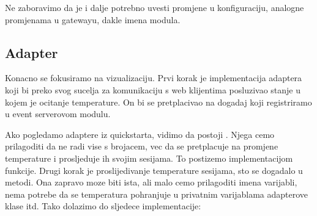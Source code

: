 \documentclass[letterpaper,10pt,croatian]{sphinxmanual}
\begin{document}
\begin{sphinxVerbatim}[commandchars=\\\{\}]
       
         \PYG{p}{[}
                     
                          
               \PYG{p}{]}
\end{sphinxVerbatim}

\sphinxAtStartPar
Ne zaboravimo da je i dalje potrebno uvesti promjene u konfiguraciju, analogne
promjenama u gatewayu, dakle imena modula.


\subsection{Adapter}
\label{\detokenize{03-hat-modbus-workshop/index:adapter}}
\noindent{}

\sphinxAtStartPar
Konacno se fokusiramo na vizualizaciju. Prvi korak je implementacija adaptera
koji bi preko svog sucelja za komunikaciju s web klijentima posluzivao stanje
u kojem je ocitanje temperature. On bi se pretplacivao na 
dogadaj koji registriramo u event serverovom modulu.

\sphinxAtStartPar
Ako pogledamo adaptere iz quickstarta, vidimo da postoji
. Njega cemo prilagoditi da ne radi vise
s brojacem, vec da se pretplacuje na promjene temperature i prosljeduje ih
svojim sesijama. To postizemo implementacijom  funkcije.
Drugi korak je proslijedivanje temperature sesijama, sto se dogadalo u
 metodi. Ona zapravo moze biti ista, ali malo cemo prilagoditi
imena varijabli, nema potrebe da se temperatura pohranjuje u privatnim
varijablama adapterove klase itd. Tako dolazimo do sljedece implementacije:
\end{document}
